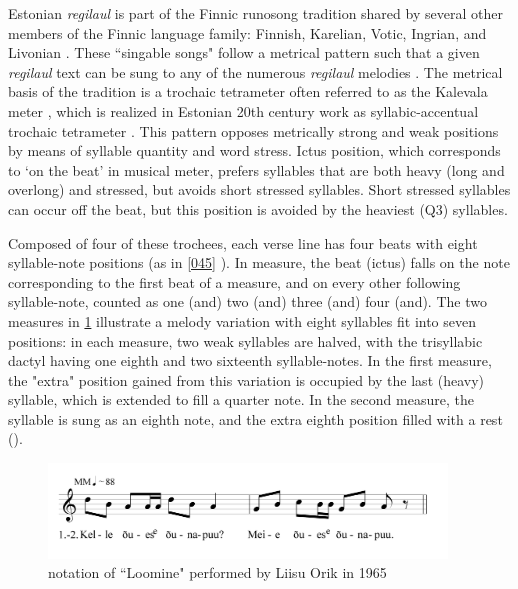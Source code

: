Estonian {\it regilaul} is part of the Finnic runosong tradition shared by several other members of the Finnic language family: Finnish, Karelian, Votic, Ingrian, and Livonian \citep{rossLehiste2001}. These ``singable songs" \citep{tormis1985} follow a metrical pattern such that a given {\it regilaul} text can be sung to any of the numerous {\it regilaul} melodies \citep{rossLehiste2001}. The metrical basis of the tradition is a trochaic tetrameter often referred to as the Kalevala meter \citep{oras2019}, which is realized in Estonian 20th century work as syllabic-accentual trochaic tetrameter \citep{lotmanLotman2013}. This pattern opposes metrically strong and weak positions by means of syllable quantity and word stress. Ictus position, which corresponds to `on the beat' in musical meter, prefers syllables that are both heavy (long and overlong) and stressed, but avoids short stressed syllables. Short stressed syllables can occur off the beat, but this position is avoided by the heaviest (Q3) syllables. 

Composed of four of these trochees, each verse line has four beats with eight syllable-note positions (as in  \ref{045} ). In   measure, the beat (ictus) falls on the note corresponding to the first beat of a measure, and on every other following syllable-note, counted as one (and) two (and) three (and) four (and).
The two measures in \ref{077} illustrate a melody variation with eight syllables fit into seven positions: in each measure, two weak syllables are halved, with the trisyllabic dactyl having one eighth and two sixteenth syllable-notes. In the first measure, the "extra" position gained from this variation is occupied by the last (heavy) syllable, which is extended to fill a quarter note. In the second measure, the syllable is sung as an eighth note, and the extra eighth position filled with a rest (\quaverRest). 


\begin{figure}[hb]
\begin{center}
\includegraphics[width=300pt]{figures/077.png}
\caption{notation of ``Loomine" performed by Liisu Orik in 1965}
\label{077}
\end{center}
\end{figure}



